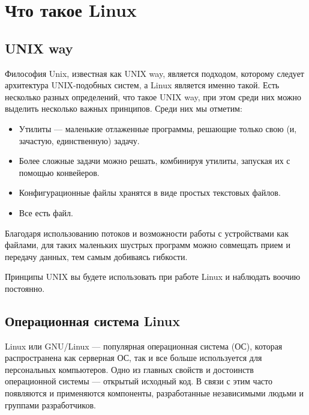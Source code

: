 \documentclass[14pt, a4paper]{article}
\begin{document}
\section*{Что такое Linux}
\subsection*{UNIX way}
Философия Unix, известная как UNIX way, является подходом, которому следует архитектура
UNIX-подобных систем, а Linux является именно такой. Есть несколько разных определений, что
такое UNIX way, при этом среди них можно выделить несколько важных принципов. Среди них мы
отметим:
\begin{itemize}
    \item Утилиты — маленькие отлаженные программы, решающие только свою (и, зачастую,
    единственную) задачу.
    \item Более сложные задачи можно решать, комбинируя утилиты, запуская их с помощью
    конвейеров.
    \item Конфигурационные файлы хранятся в виде простых текстовых файлов.
    \item Все есть файл.
\end{itemize}

Благодаря использованию потоков и возможности работы с устройствами как файлами, для
таких маленьких шустрых программ можно совмещать прием и передачу данных, тем самым
добиваясь гибкости.

Принципы UNIX вы будете использовать при работе Linux и наблюдать воочию постоянно.\\

\subsection*{Операционная система Linux}
Linux или GNU/Linux — популярная операционная система (ОС), которая распространена как
серверная ОС, так и все больше используется для персональных компьютеров. Одно из главных
свойств и достоинств операционной системы — открытый исходный код. В связи с этим часто
появляются и применяются компоненты, разработанные независимыми людьми и группами
разработчиков.
\end{document}

